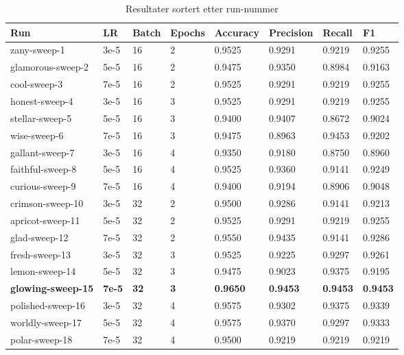 \begin{table}
\caption{Resultater sortert etter run-nummer}
\label{tab:results}
\begin{tabular}{llllllll}
\toprule
Run & LR & Batch & Epochs & Accuracy & Precision & Recall & F1 \\
\midrule
zany-sweep-1 & 3e-5 & 16 & 2 & 0.9525 & 0.9291 & 0.9219 & 0.9255 \\
glamorous-sweep-2 & 5e-5 & 16 & 2 & 0.9475 & 0.9350 & 0.8984 & 0.9163 \\
cool-sweep-3 & 7e-5 & 16 & 2 & 0.9525 & 0.9291 & 0.9219 & 0.9255 \\
honest-sweep-4 & 3e-5 & 16 & 3 & 0.9525 & 0.9291 & 0.9219 & 0.9255 \\
stellar-sweep-5 & 5e-5 & 16 & 3 & 0.9400 & 0.9407 & 0.8672 & 0.9024 \\
wise-sweep-6 & 7e-5 & 16 & 3 & 0.9475 & 0.8963 & 0.9453 & 0.9202 \\
gallant-sweep-7 & 3e-5 & 16 & 4 & 0.9350 & 0.9180 & 0.8750 & 0.8960 \\
faithful-sweep-8 & 5e-5 & 16 & 4 & 0.9525 & 0.9360 & 0.9141 & 0.9249 \\
curious-sweep-9 & 7e-5 & 16 & 4 & 0.9400 & 0.9194 & 0.8906 & 0.9048 \\
crimson-sweep-10 & 3e-5 & 32 & 2 & 0.9500 & 0.9286 & 0.9141 & 0.9213 \\
apricot-sweep-11 & 5e-5 & 32 & 2 & 0.9525 & 0.9291 & 0.9219 & 0.9255 \\
glad-sweep-12 & 7e-5 & 32 & 2 & 0.9550 & 0.9435 & 0.9141 & 0.9286 \\
fresh-sweep-13 & 3e-5 & 32 & 3 & 0.9525 & 0.9225 & 0.9297 & 0.9261 \\
lemon-sweep-14 & 5e-5 & 32 & 3 & 0.9475 & 0.9023 & 0.9375 & 0.9195 \\
\textbf{glowing-sweep-15} & \textbf{7e-5} & \textbf{32} & \textbf{3} & \textbf{0.9650} & \textbf{0.9453} & \textbf{0.9453} & \textbf{0.9453} \\
polished-sweep-16 & 3e-5 & 32 & 4 & 0.9575 & 0.9302 & 0.9375 & 0.9339 \\
worldly-sweep-17 & 5e-5 & 32 & 4 & 0.9575 & 0.9370 & 0.9297 & 0.9333 \\
polar-sweep-18 & 7e-5 & 32 & 4 & 0.9500 & 0.9219 & 0.9219 & 0.9219 \\
\bottomrule
\end{tabular}
\end{table}
